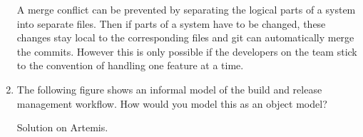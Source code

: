 \documentclass[a4paper, 10pt]{article}
\begin{document}
\begin{enumerate}
    A merge conflict can be prevented by separating the logical parts of a system into separate files.
    Then if parts of a system have to be changed, these changes stay local to the corresponding files and 
    git can automatically merge the commits. However this is only possible if the developers on the team
    stick to the convention of handling one feature at a time.

    \item The following figure shows an informal model of the build and release management workflow. 
    How would you model this as an object model?
    \vspace{0.5cm}

    Solution on Artemis.
\end{enumerate}
\end{document}
